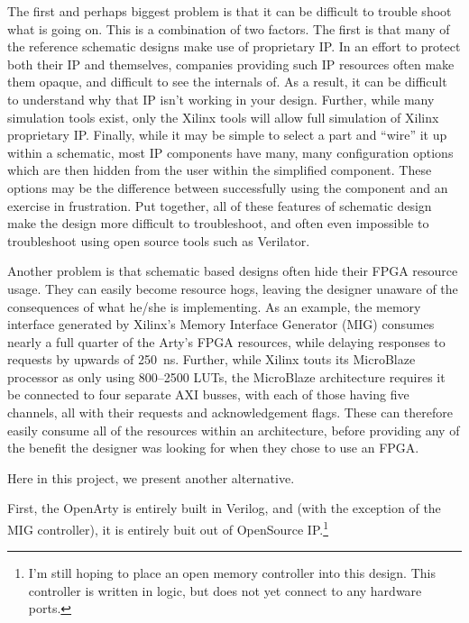 \documentclass{gqtekspec}
\begin{document}
The first and perhaps biggest problem is that it can be difficult to trouble
shoot what is going on.  This is a combination of two factors.  The first is
that many of the reference schematic designs make use of proprietary IP.  In
an effort to protect both their IP and themselves, companies providing such
IP resources often make them opaque, and difficult to see the internals of.
As a result, it can be difficult to understand why that IP isn't working in
your design.  Further, while many simulation tools exist, only the Xilinx tools
will allow full simulation of Xilinx proprietary IP.  Finally, while it may be
simple to select a part and ``wire'' it up within a schematic, most IP
components have many, many configuration options which are then hidden from the
user within the simplified component.  These options may be the difference
between successfully using the component and an exercise in frustration.  
Put together, all of these features of schematic design make the design more
difficult to troubleshoot, and often even impossible to troubleshoot using
open source tools such as Verilator.

Another problem is that schematic based designs often hide their FPGA resource
usage.  They can easily become resource hogs, leaving the designer unaware
of the consequences of what he/she is implementing.  As an example, the memory
interface generated by Xilinx's Memory Interface Generator (MIG) consumes
nearly a full quarter of the Arty's FPGA resources, while delaying responses
to requests by upwards of 250~ns.  Further, while Xilinx touts its MicroBlaze
processor as only using 800--2500 LUTs, the MicroBlaze architecture requires
it be connected to four separate AXI busses, with each of those having
five channels, all with their requests and acknowledgement flags.  These
can therefore easily consume all of the resources within an architecture, before
providing any of the benefit the designer was looking for when they chose to
use an FPGA.


%
%

Here in this project, we present another alternative.

First, the OpenArty is entirely built in Verilog, and (with the exception of
the MIG controller), it is entirely buit out of OpenSource IP.\footnote{I'm
still hoping to place an open memory controller into this design.  This
controller is written in logic, but does not yet connect to any hardware ports.}
\end{document}
